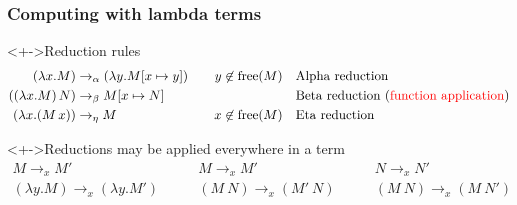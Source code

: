 \documentclass[pdftex,aspectratio=169]{beamer}
\begin{document}
\begin{frame}[fragile]
  \frametitle{Computing with lambda terms}
  \begin{block}<+->{Reduction rules}\VSPBLS
    \begin{alignat*}{2}
      (\lambda x.M) & \rightarrow_{\alpha} (\lambda y.M[x\mapsto y]) \quad 
      & y\not\in\operatorname{free}(M) & \quad\text{Alpha reduction}
      \\
      ((\lambda x.M)\,N) & \rightarrow_{\beta} M[x\mapsto N]
      && \quad\text{Beta reduction (\textcolor{red}{function application})}
      \\
      (\lambda x.(M\,x)) & \rightarrow_{\eta} M \quad
      & x\not\in\operatorname{free}(M) & \quad \text{Eta reduction}
    \end{alignat*}
  \end{block}
  \begin{block}<+->{Reductions may be applied everywhere in a term}
    \begin{displaymath}
    \begin{array}{c}
      M \rightarrow_x M'
      \\\hline
      (\lambda y.M) \rightarrow_x (\lambda y.M')
    \end{array}
    \qquad
    \begin{array}{c}
      M \rightarrow_x M'
      \\\hline
      (M~N) \rightarrow_x (M'~N)
    \end{array}
    \qquad
    \begin{array}{c}
      N \rightarrow_x N'
      \\\hline
      (M~N) \rightarrow_x (M~N')
    \end{array}
  \end{displaymath}
  \end{block}
\end{frame}
\end{document}
